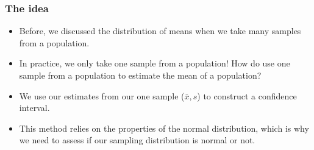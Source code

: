 \begin{frame}
\frametitle{The idea}
\begin{itemize}
\item Before, we discussed the distribution of means when we take many samples from a population.
\item In practice, we only take one sample from a population!  How do use one sample from a population to estimate the mean of a population?
\item We use our estimates from our one sample ($\bar{x}, s$) to construct a confidence interval.
\item This method relies on the properties of the normal distribution, which is why we need to assess if our sampling distribution is normal or not.
\end{itemize}
\end{frame}




